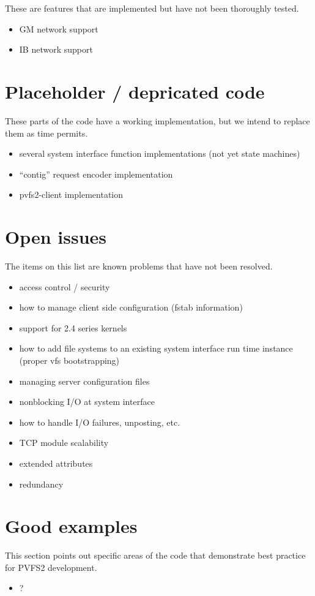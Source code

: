 \documentclass[11pt, letterpaper]{article}
\begin{document}
These are features that are implemented but have not been thoroughly tested.

\begin{itemize}
\item GM network support
\item IB network support
\end{itemize}

\section{Placeholder / depricated code}

These parts of the code have a working implementation, but we intend to
replace them as time permits.

\begin{itemize}
\item several system interface function implementations (not yet state machines)
\item ``contig'' request encoder implementation
\item pvfs2-client implementation
\end{itemize}

\section{Open issues}

The items on this list are known problems that have not been resolved.

\begin{itemize}
\item access control / security
\item how to manage client side configuration (fstab information)
\item support for 2.4 series kernels
\item how to add file systems to an existing system interface run time instance (proper vfs bootstrapping)
\item managing server configuration files
\item nonblocking I/O at system interface
\item how to handle I/O failures, unposting, etc.
\item TCP module scalability
\item extended attributes
\item redundancy
\end{itemize}

\section{Good examples}

This section points out specific areas of the code that demonstrate 
best practice for PVFS2 development.

\begin{itemize}
\item ?
\end{itemize}
\end{document}
